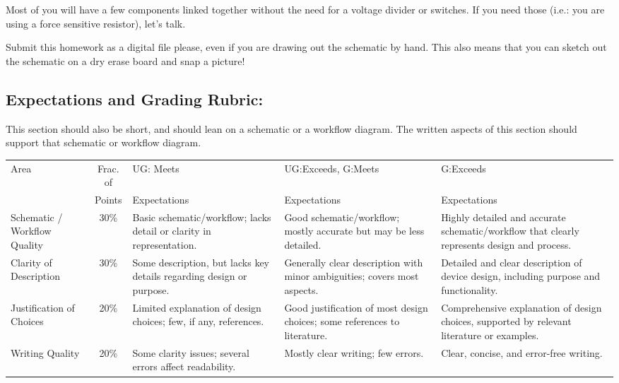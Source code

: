 \documentclass[11pt]{article}
\begin{document}
Most of you will have a few components linked together without the need for a voltage divider or switches. If you need those (i.e.: you are using a force sensitive resistor), let’s talk.

Submit this homework as a digital file please, even if you are drawing out the schematic by hand. This also means that you can sketch out the schematic on a dry erase board and snap a picture!


\subsection*{Expectations and Grading Rubric:}
This section should also be short, and should lean on a schematic or a workflow diagram.  The written aspects of this section should support that schematic or workflow diagram.

\begin{landscape}
\begin{table}
    \centering
    \small
    \begin{tabular}{p{.75in} c  p{2.25in}  p{2.25in}  p{2.25in}}
        \multirow{2}{*}{Area}  	& Frac. of   	& UG: Meets		& UG:Exceeds, G:Meets   & G:Exceeds 	  \\
                           			    & Points & Expectations  & Expectations  		& Expectations \\
        \toprule
        Schematic / Workflow Quality & 30\%\vspace{.25in} 				& Basic schematic/workflow; lacks detail or clarity in representation. & Good schematic/workflow; mostly accurate but may be less detailed. & Highly detailed and accurate schematic/workflow that clearly represents design and process. \\
        \midrule
        Clarity of Description  & 30\%\vspace{.25in}				& Some description, but lacks key details regarding design or purpose. & Generally clear description with minor ambiguities; covers most aspects. & Detailed and clear description of device design, including purpose and functionality. \\
        \midrule
        Justification of Choices & 20\%\vspace{.25in}				& Limited explanation of design choices; few, if any, references. & Good justification of most design choices; some references to literature. & Comprehensive explanation of design choices, supported by relevant literature or examples. \\
        \midrule
        Writing Quality 		& 20\%\vspace{.25in}				& Some clarity issues; several errors affect readability. & Mostly clear writing; few errors. & Clear, concise, and error-free writing. \\
        \bottomrule
    \end{tabular}
\end{table}
\end{landscape}
\end{document}
